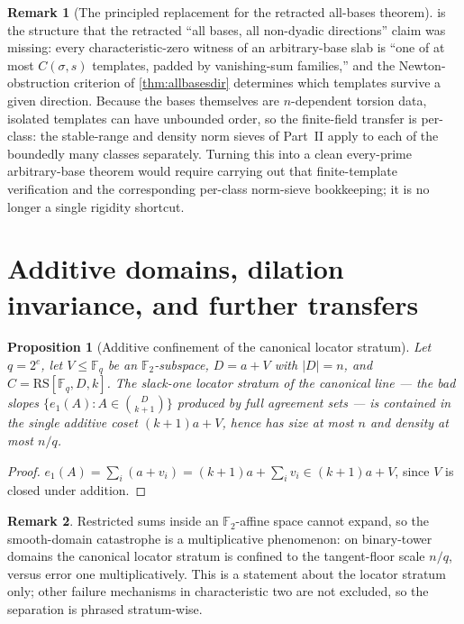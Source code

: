 \documentclass[11pt]{article}
\newtheorem{proposition}[proposition]{Proposition}
\theoremstyle{definition}
\newtheorem{remark}[remark]{Remark}
\newcommand{\F}{\mathbb F}
\newcommand{\RS}{\mathrm{RS}}
\begin{document}
\begin{remark}[The principled replacement for the retracted all-bases theorem]\label{rem:templaterepair}
 is the structure that the retracted ``all bases, all non-dyadic directions'' claim was missing: every characteristic-zero witness of an arbitrary-base slab is ``one of at most $C(\sigma,s)$ templates, padded by vanishing-sum families,'' and the Newton-obstruction criterion of \cref{thm:allbasesdir} determines which templates survive a given direction.  Because the bases themselves are $n$-dependent torsion data, isolated templates can have unbounded order, so the finite-field transfer is per-class: the stable-range and density norm sieves of Part~II apply to each of the boundedly many classes separately.  Turning this into a clean every-prime arbitrary-base theorem would require carrying out that finite-template verification and the corresponding per-class norm-sieve bookkeeping; it is no longer a single rigidity shortcut.
\end{remark}

\section{Additive domains, dilation invariance, and further transfers}\label{sec:further}

\begin{proposition}[Additive confinement of the canonical locator stratum]\label{prop:additive}
Let $q=2^e$, let $V\le\F_q$ be an $\F_2$-subspace, $D=a+V$ with $|D|=n$, and $C=\RS[\F_q,D,k]$.  The slack-one locator stratum of the canonical line --- the bad slopes $\{e_1(A):A\in\binom D{k+1}\}$ produced by full agreement sets --- is contained in the single additive coset $(k+1)a+V$, hence has size at most $n$ and density at most $n/q$.
\end{proposition}

\begin{proof}
$e_1(A)=\sum_{i}(a+v_i)=(k+1)a+\sum_iv_i\in(k+1)a+V$, since $V$ is closed under addition.
\end{proof}

\begin{remark}
Restricted sums inside an $\F_2$-affine space cannot expand, so the smooth-domain catastrophe is a multiplicative phenomenon: on binary-tower domains the canonical locator stratum is confined to the tangent-floor scale $n/q$, versus error one multiplicatively.  This is a statement about the locator stratum only; other failure mechanisms in characteristic two are not excluded, so the separation is phrased stratum-wise.
\end{remark}
\end{document}
